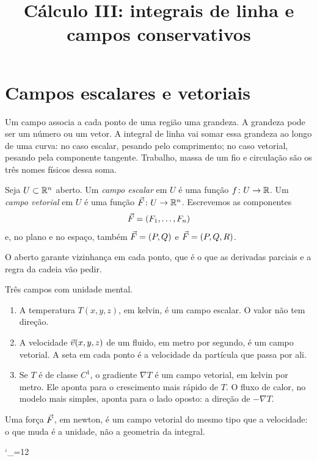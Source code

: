 \documentclass[11pt,a4paper]{article}
\title{Cálculo III: integrais de linha e campos conservativos}
\author{}
\date{}
\begin{document}
\maketitle
\tableofcontents

\section{Campos escalares e vetoriais}

Um campo associa a cada ponto de uma região uma grandeza. A grandeza pode ser um número ou um vetor. A integral de linha vai somar essa grandeza ao longo de uma curva: no caso escalar, pesando pelo comprimento; no caso vetorial, pesando pela componente tangente. Trabalho, massa de um fio e circulação são os três nomes físicos dessa soma.

\begin{definicao}
Seja $U\subset\mathbb{R}^n$ aberto. Um \emph{campo escalar} em $U$ é uma função $f\colon U\to\mathbb{R}$. Um \emph{campo vetorial} em $U$ é uma função $\vec{F}\colon U\to\mathbb{R}^n$. Escrevemos as componentes
\[
\vec{F}=(F_1,\ldots,F_n)
\]
e, no plano e no espaço, também $\vec{F}=(P,Q)$ e $\vec{F}=(P,Q,R)$.
\end{definicao}

O aberto garante vizinhança em cada ponto, que é o que as derivadas parciais e a regra da cadeia vão pedir.

\begin{exemplo}
Três campos com unidade mental.
\begin{enumerate}
\item A temperatura $T(x,y,z)$, em kelvin, é um campo escalar. O valor não tem direção.
\item A velocidade $\vec{v}(x,y,z)$ de um fluido, em metro por segundo, é um campo vetorial. A seta em cada ponto é a velocidade da partícula que passa por ali.
\item Se $T$ é de classe $C^1$, o gradiente $\nabla T$ é um campo vetorial, em kelvin por metro. Ele aponta para o crescimento mais rápido de $T$. O fluxo de calor, no modelo mais simples, aponta para o lado oposto: a direção de $-\nabla T$.
\end{enumerate}
Uma força $\vec{F}$, em newton, é um campo vetorial do mesmo tipo que a velocidade: o que muda é a unidade, não a geometria da integral.
\end{exemplo}

\begingroup\catcode`\_=12
\endgroup
\end{document}
